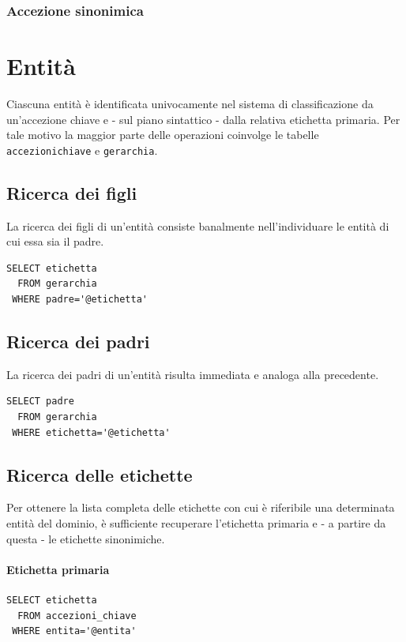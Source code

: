\documentclass[10pt,a4paper,headinclude,footinclude,hidelinks]{scrreprt} %
\begin{document}
	\subsubsection{Accezione sinonimica}

	\section{Entit\`a}
	Ciascuna entità è identificata univocamente nel sistema di classificazione da un'accezione chiave e - sul piano sintattico - dalla relativa etichetta primaria. Per tale motivo la maggior parte delle operazioni coinvolge le tabelle \texttt{accezioni\textunderscore chiave} e \texttt{gerarchia}.
 
	\subsection{Ricerca dei figli}
	La ricerca dei figli di un'entità consiste banalmente nell'individuare le entità di cui essa sia il padre.
\begin{verbatim}
SELECT etichetta
  FROM gerarchia
 WHERE padre='@etichetta'
\end{verbatim}

	\subsection{Ricerca dei padri}
	La ricerca dei padri di un'entità risulta immediata e analoga alla precedente.
\begin{verbatim}
SELECT padre
  FROM gerarchia
 WHERE etichetta='@etichetta'
\end{verbatim}

	\subsection{Ricerca delle etichette}
	Per ottenere la lista completa delle etichette con cui è riferibile una determinata entità del dominio, è sufficiente recuperare l'etichetta primaria e - a partire da questa - le etichette sinonimiche.

	\paragraph{Etichetta primaria}
\begin{verbatim}
SELECT etichetta
  FROM accezioni_chiave
 WHERE entita='@entita'
\end{verbatim}
\end{document}
